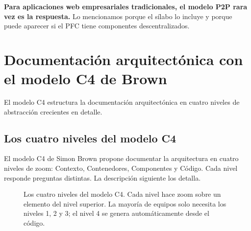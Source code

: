 \textbf{Para aplicaciones web empresariales tradicionales, el modelo
P2P rara vez es la respuesta.} Lo mencionamos porque el sílabo lo
incluye y porque puede aparecer si el PFC tiene componentes
descentralizados.

\section{Documentación arquitectónica con el modelo C4 de Brown}

El modelo C4 \cite{brown2023c4} estructura la documentación
arquitectónica en cuatro niveles de abstracción crecientes en detalle.

\subsection{Los cuatro niveles del modelo C4}

El modelo C4 de Simon Brown propone documentar la
arquitectura en cuatro niveles de zoom: Contexto, Contenedores,
Componentes y Código. Cada nivel responde preguntas distintas. La
descripción siguiente los detalla.


\begin{figure}[htbp]
\centering
{}
\caption{Los cuatro niveles del modelo C4. Cada nivel hace zoom sobre
un elemento del nivel superior. La mayoría de equipos solo necesita
los niveles 1, 2 y 3; el nivel 4 se genera automáticamente desde el
código.}
\end{figure}

